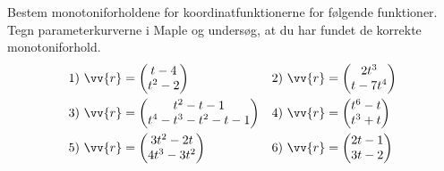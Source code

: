 Bestem monotoniforholdene for koordinatfunktionerne for følgende funktioner. Tegn parameterkurverne i Maple og undersøg, at du har fundet de korrekte monotoniforhold. 
\begin{align*}
	&1) \ \vv{r} = 
	\begin{pmatrix}
		t-4\\
		t^2-2
	\end{pmatrix}   
	&&2) \ \vv{r} = 
	\begin{pmatrix}
		2t^3\\
		t-7t^4
	\end{pmatrix}   \\
	&3) \ \vv{r} = 
	\begin{pmatrix}
		t^2-t-1\\
		t^4-t^3-t^2-t-1
	\end{pmatrix}   
	 &&4) \ \vv{r} = 
	\begin{pmatrix}
		t^6-t\\
		t^3+t
	\end{pmatrix}   \\
	&5) \ 
	\vv{r} = 
	\begin{pmatrix}
		3t^2-2t\\
		4t^3-3t^2
	\end{pmatrix}  
	  &&6) \
	  \vv{r} = 
	\begin{pmatrix}
		2t-1\\
		3t-2
	\end{pmatrix}    
\end{align*}
